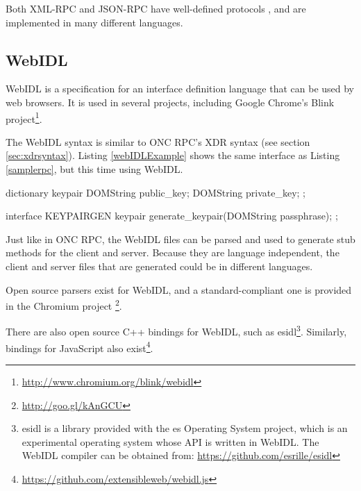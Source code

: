 Both XML-RPC and JSON-RPC have well-defined protocols \cite{jsonrpcspec}\cite{xmlrpcspec}, and are implemented in many different languages.

\subsection{WebIDL} %
\label{sub:webidl_intro}
WebIDL is a specification \cite{webidlw3c} for an interface definition language that can be used by web browsers. It is used in several projects, including Google Chrome's Blink project\footnote{\url{http://www.chromium.org/blink/webidl}}.

The WebIDL syntax is similar to ONC RPC's XDR syntax (see section \ref{sec:xdrsyntax}). Listing \ref{webIDLExample} shows the same interface as Listing \ref{samplerpc}, but this time using WebIDL.

\begin{code}
dictionary keypair {
  DOMString public_key;
  DOMString private_key;
};

interface KEYPAIRGEN {
  keypair generate_keypair(DOMString passphrase);
};
\end{code}

Just like in ONC RPC, the WebIDL files can be parsed and used to generate stub methods for the client and server. Because they are language independent, the client and server files that are generated could be in different languages. 

Open source parsers exist for WebIDL, and a standard-compliant one is provided in the Chromium project
\footnote{ \url{http://goo.gl/kAnGCU} }. 

There are also open source C++ bindings for WebIDL, such as esidl\footnote{esidl is a library provided with the es Operating System project, which is an experimental operating system whose API is written in WebIDL. The WebIDL compiler can be obtained from: \url{https://github.com/esrille/esidl}}. Similarly, bindings for JavaScript also exist\footnote{\url{https://github.com/extensibleweb/webidl.js}}. 


